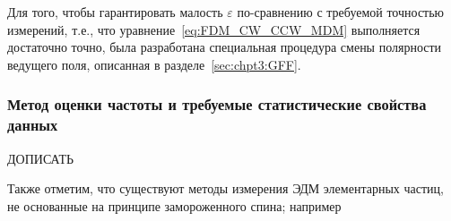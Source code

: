 Для того, чтобы гарантировать малость $\varepsilon$ по-сравнению с требуемой точностью измерений, т.е., что уравнение~\eqref{eq:FDM_CW_CCW_MDM} выполняется достаточно точно, была разработана специальная процедура смены полярности ведущего поля, описанная в разделе~\ref{sec:chpt3:GFF}.

\subsubsection{Метод оценки частоты и требуемые статистические свойства данных}
ДОПИСАТЬ

Также отметим, что существуют методы измерения ЭДМ элементарных частиц, не основанные на принципе замороженного спина; например~\cite{COSY:SpinTuneMapping}